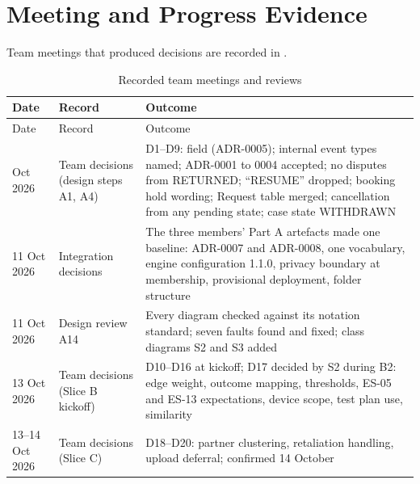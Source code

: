 \chapter{Meeting and Progress Evidence}\label{app:meeting-progress-evidence}
Team meetings that produced decisions are recorded in .

\begingroup
\begin{longtable}{@{}L{64pt}L{124pt}L{187pt}@{}}
\caption{Recorded team meetings and reviews}\label{tab:recorded-team-meetings-reviews}\\
\toprule
Date & Record & Outcome \\
\midrule
\endfirsthead
\toprule
Date & Record & Outcome \\
\midrule
\endhead
\bottomrule
{} Oct 2026 & Team decisions (design steps A1, A4) & D1--D9:  field (ADR-0005); internal event types named; ADR-0001 to 0004 accepted; no disputes from RETURNED; ``RESUME'' dropped; booking hold wording; Request table merged; cancellation from any pending state; case state WITHDRAWN \\
11 Oct 2026 & Integration decisions & The three members' Part A artefacts made one baseline: ADR-0007 and ADR-0008, one vocabulary, engine configuration 1.1.0, privacy boundary at membership, provisional deployment, folder structure \\
11 Oct 2026 & Design review A14 & Every diagram checked against its notation standard; seven faults found and fixed; class diagrams S2 and S3 added \\
13 Oct 2026 & Team decisions (Slice B kickoff) & D10--D16 at kickoff; D17 decided by S2 during B2: edge weight, outcome mapping, thresholds, ES-05 and ES-13 expectations, device scope, test plan use, similarity \\
13--14 Oct 2026 & Team decisions (Slice C) & D18--D20: partner clustering, retaliation handling, upload deferral; confirmed 14 October \\
\end{longtable}
\endgroup
